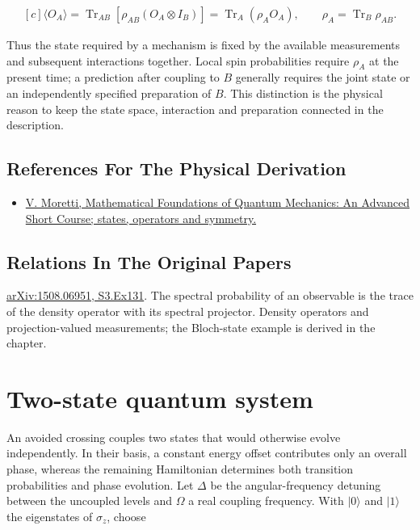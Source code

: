 \documentclass[11pt,oneside]{book}
\newenvironment{centeredalign}{\[\begin{gathered}[c]}{\end{gathered}\]}
\begin{document}
\begin{centeredalign}
\langle O_A\rangle=\operatorname{Tr}_{AB}[\rho_{AB}(O_A\otimes I_B)]
=\operatorname{Tr}_A(\rho_A O_A),\qquad \rho_A=\operatorname{Tr}_B\rho_{AB}.
\end{centeredalign}

Thus the state required by a mechanism is fixed by the available measurements and subsequent interactions together. Local spin probabilities require \(\rho_A\) at the present time; a prediction after coupling to \(B\) generally requires the joint state or an independently specified preparation of \(B\). This distinction is the physical reason to keep the state space, interaction and preparation connected in the description.

\subsection*{References For The Physical Derivation}
\begin{itemize}
\item \href{https://arxiv.org/abs/1508.06951}{V. Moretti, Mathematical Foundations of Quantum Mechanics: An Advanced Short Course; states, operators and symmetry.}
\end{itemize}

\subsection*{Relations In The Original Papers}

\href{https://arxiv.org/html/1508.06951#S3.Ex131}{arXiv:1508.06951, S3.Ex131}. The spectral probability of an observable is the trace of the density operator with its spectral projector. Density operators and projection-valued measurements; the Bloch-state example is derived in the chapter.



\clearpage

\section{Two-state quantum system}

\label{topic:two-state-quantum-system}

An avoided crossing couples two states that would otherwise evolve independently. In their basis, a constant energy offset contributes only an overall phase, whereas the remaining Hamiltonian determines both transition probabilities and phase evolution. Let \(\Delta\) be the angular-frequency detuning between the uncoupled levels and \(\Omega\) a real coupling frequency. With \(|0\rangle\) and \(|1\rangle\) the eigenstates of \(\sigma_z\), choose
\end{document}
